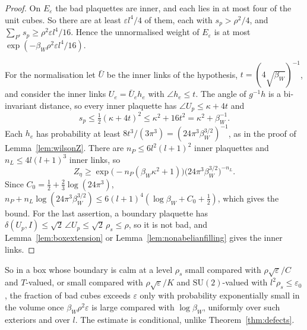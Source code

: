 \documentclass[11pt]{amsart}
\theoremstyle{definition}
\theoremstyle{remark}
\numberwithin{equation}{section}
\newcommand{\SU}{\mathrm{SU}}
\begin{document}
\begin{proof}
On $E_\varepsilon$ the bad plaquettes are inner, and each lies in at most
four of the unit cubes. So there are at least $\varepsilon l^4/4$ of them,
each with $s_p>\rho^2/4$, and $\sum_{P^\circ}s_p\ge\rho^2\varepsilon l^4
/16$. Hence the unnormalised weight of $E_\varepsilon$ is at most $\exp(
-\beta_W\rho^2\varepsilon l^4/16)$.

For the normalisation let $\bar U$ be the inner links of the hypothesis,
$t=(4\sqrt{\beta_W})^{-1}$, and consider the inner links $U_e=\bar U_eh_e$
with $\angle h_e\le t$. The angle of $g^{-1}h$ is a bi-invariant distance,
so every inner plaquette has $\angle U_p\le\kappa+4t$ and
\[
s_p\le\tfrac12(\kappa+4t)^2\le\kappa^2+16t^2=\kappa^2+\beta_W^{-1} .
\]
Each $h_e$ has probability at least $8t^3/(3\pi^3)=(24\pi^3\beta_W^{3/2}
)^{-1}$, as in the proof of Lemma~\ref{lem:wilsonZ}. There are $n_P\le6l^2
(l+1)^2$ inner plaquettes and $n_L\le4l(l+1)^3$ inner links, so
\[
Z_\eta\ge\exp\bigl(-n_P(\beta_W\kappa^2+1)\bigr)\bigl(24\pi^3\beta_W^{3/2}
\bigr)^{-n_L}.
\]
Since $C_0=\frac12+\frac23\log(24\pi^3)$, $n_P+n_L\log(24\pi^3\beta_W^{3/2}
)\le6(l+1)^4(\log\beta_W+C_0+\frac12)$, which gives the bound. For the last
assertion, a boundary plaquette has $\delta(U_p,I)\le\sqrt2\,\angle U_p\le
\sqrt2\,\rho_s\le\rho$, so it is not bad, and Lemma~\ref{lem:boxextension}
or Lemma~\ref{lem:nonabelianfilling} gives the inner links.
\end{proof}

So in a box whose boundary is calm at a level $\rho_s$ small compared with
$\rho\sqrt\varepsilon/C$ and $T$-valued, or small compared with
$\rho\sqrt\varepsilon/K$ and $\SU(2)$-valued with $l^2\rho_s\le
\varepsilon_0$, the fraction of bad cubes
exceeds $\varepsilon$ only with probability exponentially small in the
volume once $\beta_W\rho^2\varepsilon$ is large compared with $\log
\beta_W$, uniformly over such exteriors and over $l$. The estimate is
conditional, unlike Theorem~\ref{thm:defects}.
\end{document}
